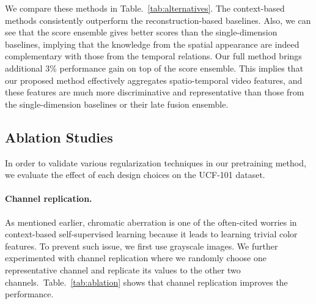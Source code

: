 \documentclass[letterpaper]{article} \usepackage{aaai19}  \usepackage{times}  \usepackage{helvet}  \usepackage{courier}  \usepackage{url}  \usepackage{graphicx}  \frenchspacing  \setlength{\pdfpagewidth}{8.5in}  \setlength{\pdfpageheight}{11in}
\newcommand{\tabref}[1]{Table.~\ref{#1}}
\begin{document}
We compare these methods in \tabref{tab:alternatives}. The context-based methods consistently outperform the reconstruction-based baselines. Also, we can see that the score ensemble gives better scores than the single-dimension baselines, implying that the knowledge from the spatial appearance are indeed complementary with those from the temporal relations. Our full method brings additional 3\% performance gain on top of the score ensemble. This implies that our proposed method effectively aggregates spatio-temporal video features, and these features are much more discriminative and representative than those from the single-dimension baselines or their late fusion ensemble.


\begin{table}[t]
\centering
{}
\caption{\textbf{Ablation studies.} Top-1 accuracies on UCF101. Each methods are accumulated down from the top and use 3D ResNet-18. The accuracies are averaged over three splits. }
\label{tab:ablation}
\end{table}


\subsection{Ablation Studies}
In order to validate various regularization techniques in our pretraining method, we evaluate the effect of each design choices on the UCF-101 dataset. 

\noindent \paragraph{Channel replication.} \quad As mentioned earlier, chromatic aberration is one of the often-cited worries in context-based self-supervised learning because it leads to learning trivial color features. To prevent such issue, we first use grayscale images. We further experimented with channel replication where we randomly choose one representative channel and replicate its values to the other two channels.~\tabref{tab:ablation} shows that channel replication improves the performance.
\end{document}
